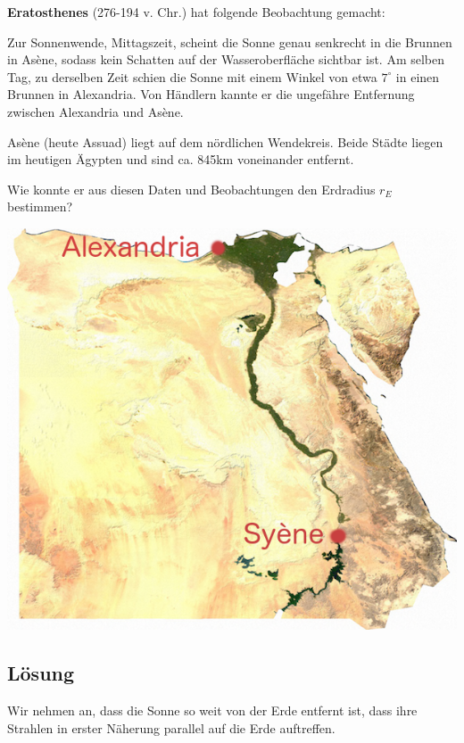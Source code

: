 \documentclass{scrartcl}
\newcommand{\RE}{r_E} %
\newcommand{\person}[1]{\textbf{#1}} %
\begin{document}
  \person{Eratosthenes} (276-194 v. Chr.) hat folgende Beobachtung gemacht:

  Zur Sonnenwende, Mittagszeit, scheint die Sonne genau senkrecht in die Brunnen in Asène, sodass kein Schatten auf der Wasseroberfläche sichtbar ist.
  Am selben Tag, zu derselben Zeit schien die Sonne mit einem Winkel von etwa $7^\circ$ in einen Brunnen in Alexandria. Von Händlern kannte er die ungefähre Entfernung zwischen Alexandria und Asène.

  Asène (heute Assuad) liegt auf dem nördlichen Wendekreis.
  Beide Städte liegen im heutigen Ägypten und sind ca. 845km voneinander entfernt.

  Wie konnte er aus diesen Daten und Beobachtungen den Erdradius $\RE$ bestimmen?


  \vspace{1em}

  \begin{center}
    \includegraphics{egypt_sat.png}
  \end{center}

  \newpage

  \subsection{Lösung}

  Wir nehmen an, dass die Sonne so weit von der Erde entfernt ist, dass ihre Strahlen in erster Näherung parallel auf die Erde auftreffen.
\end{document}
